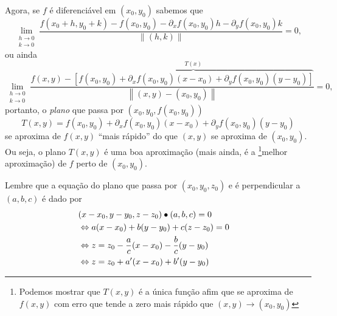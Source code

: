 Agora, se \(f\) é diferenciável em \((x_0,y_0)\) sabemos que {\small \[\lim_{\substack{h\to 0 \\ k\to 0}} \frac{f(x_0+h,y_0+k)-f(x_0,y_0) - \partial_x f(x_0,y_0)h - \partial_y f(x_0,y_0)k}{\|(h,k)\|} = 0,\]} ou ainda {\small \[\lim_{\substack{h\to 0 \\ k\to 0}} \frac{f(x,y) - \overbrace{[f(x_0,y_0) + \partial_x f(x_0,y_0)(x-x_0) + \partial_y f(x_0,y_0)(y-y_0)]}^{\displaystyle T(x)}}{\left\|(x,y) - (x_0,y_0)\right\|} = 0,\]} portanto, o \textit{plano} que passa por \((x_0,y_0,f(x_0,y_0))\)
    \begin{equation}\label{eq.PlanoTangente}
        T(x,y) = f(x_0,y_0) + \partial_x f(x_0,y_0)(x-x_0) + \partial_y f(x_0,y_0)(y-y_0)
    \end{equation}
se aproxima de \(f(x,y)\) ``mais rápido'' do que \((x,y)\) se aproxima de \((x_0,y_0)\). Ou seja, o plano \(T(x,y)\) é uma boa aproximação (mais ainda, é a \footnote{Podemos mostrar que \(T(x,y)\) é a única função afim que se aproxima de \(f(x,y)\) com erro que tende a zero mais rápido que \((x,y)\to(x_0,y_0)\)}{melhor aproximação}) de \(f\) perto de \((x_0,y_0)\).

\begin{remark}
    Lembre que a equação do plano que passa por \((x_0,y_0,z_0)\) e é perpendicular a \((a,b,c)\) é dado por
        \begin{align*}
            {\lefteqn{(x-x_0,y-y_0,z-z_0)\bullet(a,b,c) = 0}} \\
                & \Leftrightarrow a(x-x_0) + b(y-y_0) + c(z-z_0) = 0 \\
                & \Leftrightarrow z = z_0 - \frac{a}{c}(x-x_0) - \frac{b}{c}(y-y_0) \\
                & \Leftrightarrow z = z_0 + a'(x-x_0) + b'(y-y_0)
        \end{align*}
\end{remark}

